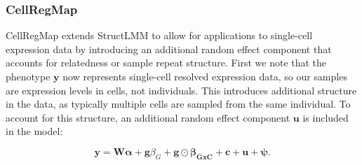 \subsubsection*{CellRegMap}
CellRegMap extends StructLMM to allow for applications to single-cell expression data by introducing an additional random effect component that accounts for relatedness or sample repeat structure. 
First we note that the phenotype $\mathbf{y}$ now represents single-cell resolved expression data, so our samples are expression levels in cells, not individuals. 
This introduces additional structure in the data, as typically multiple cells are sampled from the same individual.
To account for this structure, an additional random effect component $\mathbf{u}$ is included in the model: 

\begin{equation}\label{eq:scStructLMM}
 \mathbf{y} =  \mathbf{W}\boldsymbol{\alpha} + \mathbf{g}\beta_G + \mathbf{g} \odot \boldsymbol{\beta_{GxC}} + \mathbf{c} + \mathbf{u} + \boldsymbol{\psi}. 
\end{equation}

